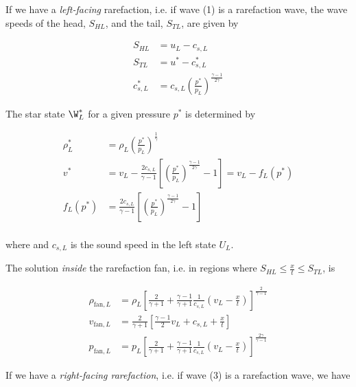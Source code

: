 If we have a \emph{left-facing} rarefaction, i.e. if wave (1) is a rarefaction wave,
the wave speeds of the head, $S_{HL}$, and the tail, $S_{TL}$, are given by

\begin{align}
	S_{HL} &= u_L - c_{s,L}\\
	S_{TL} &= u^* - c_{s,L}^*\\
	c_{s,L}^*  &= c_{s,L} \left( \frac{p^*}{p_L} \right) ^ \frac{\gamma - 1}{2 \gamma}
\end{align}

The star state $\W_L^*$ for a given pressure $p^*$ is determined by

\begin{align}
	\rho^*_L &=
		\rho_L \left( \frac{p^*}{p_L} \right) ^ \frac{1}{\gamma}\\
	v^* &=
		v_L - \frac{2 c_{s,L}}{\gamma - 1} \left[ \left( \frac{p^*}{p_L} \right) ^ \frac{\gamma -
1}{2 \gamma} -1  \right]
		= v_L - f_L(p^*) \label{eq:velocity-rarefaction-left} \\
    f_L(p^*) &=
        \frac{2 c_{s,L}}{\gamma - 1} \left[ \left( \frac{p^*}{p_L} \right) ^ \frac{\gamma - 1}{2
\gamma} -1  \right]\\
\end{align}


where and $c_{s,L}$ is the sound speed in the left state $U_L$.



The solution \emph{inside} the rarefaction fan, i.e. in regions where $S_{HL} \leq \frac{x}{t}
\leq S_{TL}$, is

\begin{align}
	\rho_{\text{fan}, L} &=
		\rho_L \left[ \frac{2}{\gamma + 1} + \frac{\gamma - 1}{\gamma + 1} \frac{1}{c_{s,L}}
\left(v_L - \frac{x}{t}\right) \right] ^ \frac{2}{\gamma -1 } \label{eq:rho-rarefaction-fan-left}\\
	v_{\text{fan}, L} &=
		\frac{2}{\gamma + 1} \left[ \frac{\gamma - 1}{2} v_L + c_{s,L} + \frac{x}{t}  \right] \\
	p_{\text{fan}, L} &=
		p_L \left[ \frac{2}{\gamma + 1} + \frac{\gamma - 1}{\gamma + 1} \frac{1}{c_{s,L}} \left(v_L
- \frac{x}{t}\right) \right] ^ \frac{2 \gamma}{\gamma -1} \label{eq:pressure-rarefaction-fan-left}
\end{align}









If we have a \emph{right-facing rarefaction}, i.e. if wave (3) is a rarefaction wave, we have

